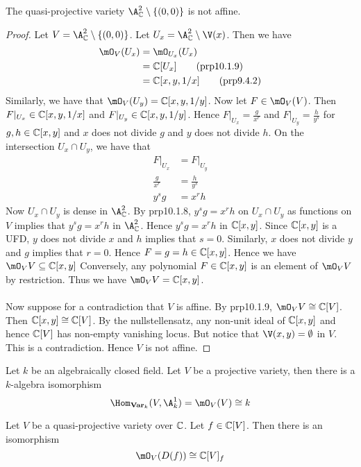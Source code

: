 \documentclass[a4paper]{article}
\begin{document}
\begin{eg}{}{} The quasi-projective variety $\A_\C^2\setminus\{(0,0)\}$ is not affine. 
\begin{proof}
Let $V=\A_\C^2\setminus\{(0,0)\}$. Let $U_x=\A_\C^2\setminus\V(x)$. Then we have 
\begin{align*}
\mO_V(U_x)&=\mO_{U_x}(U_x)\\
&=\C[U_x]\tag{prp10.1.9}\\
&=\C[x,y,1/x]\tag{prp9.4.2}
\end{align*}
Similarly, we have that $\mO_V(U_y)=\C[x,y,1/y]$. Now let $F\in\mO_V(V)$. Then $F|_{U_x}\in\mathbb{C}[x,y,1/x]$ and $F|_{U_y}\in\mathbb{C}[x,y,1/y]$. Hence $F|_{U_x}=\frac{g}{x^r}$ and $F|_{U_y}=\frac{h}{y^s}$ for $g,h\in\mathbb{C}[x,y]$ and $x$ does not divide $g$ and $y$ does not divide $h$. On the intersection $U_x\cap U_y$, we have that 
\begin{align*}
F|_{U_x}&=F|_{U_y}\\
\frac{g}{x^r}&=\frac{h}{y^s}\\
y^sg&=x^rh
\end{align*}
Now $U_x\cap U_y$ is dense in $\A_\C^2$. By prp10.1.8, $y^sg=x^rh$ on $U_x\cap U_y$ as functions on $V$ implies that $y^sg=x^rh$ in $\A_\C^2$. Hence $y^sg=x^rh$ in $\mathbb{C}[x,y]$. Since $\mathbb{C}[x,y]$ is a UFD, $y$ does not divide $x$ and $h$ implies that $s=0$. Similarly, $x$ does not divide $y$ and $g$ implies that $r=0$. Hence $F=g=h\in\mathbb{C}[x,y]$. Hence we have $\mO_VV\subseteq\C[x,y]$ Conversely, any polynomial $F\in\mathbb{C}[x,y]$ is an element of $\mO_VV$ by restriction. Thus we have $\mO_VV=\C[x,y]$. \\~\\

Now suppose for a contradiction that $V$ is affine. By prp10.1.9, $\mO_VV\cong\C[V]$. Then $\mathbb{C}[x,y]\cong\mathbb{C}[V]$. By the nullstellensatz, any non-unit ideal of $\mathbb{C}[x,y]$ and hence $\mathbb{C}[V]$ has non-empty vanishing locus. But notice that $\V(x,y)=\emptyset$ in $V$. This is a contradiction. Hence $V$ is not affine. 
\end{proof}
\end{eg}

\begin{prp}{}{} Let $k$ be an algebraically closed field. Let $V$ be a projective variety, then there is a $k$-algebra isomorphism $$\Hom_{\bold{Var}_k}(V,\A_k^1)=\mO_V(V)\cong k$$
\end{prp}

\begin{prp}{}{} Let $V$ be a quasi-projective variety over $\mathbb{C}$. Let $f\in\mathbb{C}[V]$. Then there is an isomorphism $$\mO_V(D(f))\cong\C[V]_f$$
\end{prp}
\end{document}
